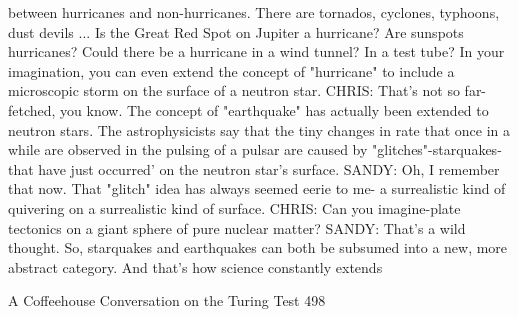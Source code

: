    between hurricanes and non-hurricanes. There are tornados, cyclones, typhoons,
   dust devils ... Is the Great Red Spot on Jupiter a hurricane? Are sunspots
   hurricanes? Could there be a hurricane in a wind tunnel? In a test tube? In your
   imagination, you can even extend the concept of "hurricane" to include a
   microscopic storm on the surface of a neutron star.
CHRIS: That's not so far-fetched, you know. The concept of "earthquake" has actually
   been extended to neutron stars. The astrophysicists say that the tiny changes in
   rate that once in a while are observed in the pulsing of a pulsar are caused by
   "glitches"-starquakes-that have just occurred' on the neutron star's surface.
SANDY: Oh, I remember that now. That "glitch" idea has always seemed eerie to me-
   a surrealistic kind of quivering on a surrealistic kind of surface.
CHRIS: Can you imagine-plate tectonics on a giant sphere of pure nuclear matter?
SANDY: That's a wild thought. So, starquakes and earthquakes can both be subsumed
   into a new, more abstract category. And that's how science constantly extends


A Coffeehouse Conversation on the Turing Test                                       498

